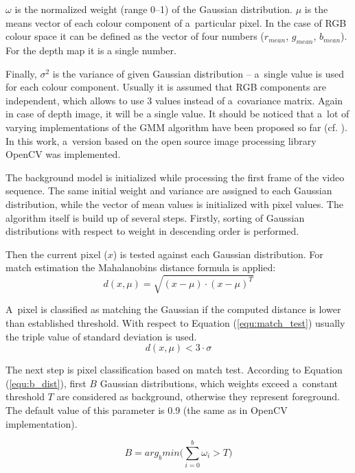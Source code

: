 \documentclass[b5paper,10pt,twoside]{article}
\begin{document}
{$\omega$ is the normalized weight (range 0--1) of the Gaussian distribution.
$\mu$ is the means vector of each colour component of a~particular pixel. 
In the case of RGB colour space it can be defined as the vector of four numbers ($r_{mean}$, $g_{mean}$, $b_{mean}$).
For the depth map it is a single number. 

Finally, $\sigma^2$ is the variance of given Gaussian distribution -- a~single value is used for each colour component.
Usually it is assumed that RGB components are independent, which allows to use 3 values instead of a~covariance matrix. Again in case of depth image, it will be a single value.
It should be noticed that a~lot of varying implementations of the GMM algorithm have been proposed so far (cf. \cite{Bouwmans_2008}). 
In this work, a~version based on the open source image processing library OpenCV was implemented. 


The background model is initialized while processing the first frame of the video sequence. 
The same initial weight and variance are assigned to each Gaussian distribution, while the vector of mean values is initialized with pixel values. 
The algorithm itself is build up of several steps. 
Firstly, sorting of Gaussian distributions with respect to weight in descending order is performed. 

Then the current pixel ($x$) is tested against each Gaussian distribution. 
For match estimation the Mahalanobins distance formula is applied:
\begin{equation}
\label{equ:mah_dist}
d(x, \mu) = \sqrt{(x-\mu)\cdot(x-\mu)^T}
\end{equation}




A~pixel is classified as matching the Gaussian if the computed distance is lower than established threshold. 
With respect to Equation (\ref{equ:match_test}) usually the triple value of standard deviation is used.
\begin{equation}
\label{equ:match_test}
d(x, \mu) < 3 \cdot \sigma
\end{equation}


The next step is pixel classification based on match test. 
According to Equation (\ref{equ:b_dist}), first $B$ Gaussian distributions, which weights exceed a~constant threshold $T$ are considered as background, otherwise they represent foreground. The default value of this parameter is 0.9 (the same as in OpenCV implementation).


\begin{equation}
\label{equ:b_dist}
B = arg_b min \Bigg( \sum_{i=0}^{b}\omega_i>T \Bigg)
\end{equation}



}
\end{document}
